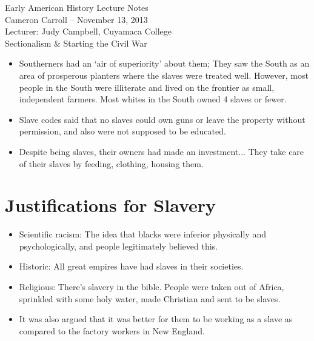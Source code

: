 \documentclass{article}
\begin{document}
\begin{center}
  {\small{} Early American History Lecture Notes} \\[0.6cm]
  {\small{} Cameron Carroll -- November 13, 2013} \\[0.6cm]
  {\small{} Lecturer: Judy Campbell, Cuyamaca College}\\[1cm]
  {\small{} Sectionalism \& Starting the Civil War}\\[1cm]
\end{center}

\tableofcontents
\newpage


\begin{itemize}
  \item Southerners had an `air of superiority' about them; They saw the South as an area of prosperous planters where the slaves were treated well. However, most people in the South were illiterate and lived on the frontier as small, independent farmers. Most whites in the South owned 4 slaves or fewer.
  \item Slave codes said that no slaves could own guns or leave the property without permission, and also were not supposed to be educated.
  \item Despite being slaves, their owners had made an investment... They take care of their slaves by feeding, clothing, housing them.
\end{itemize}

\section{Justifications for Slavery}
  \begin{itemize}
  \item Scientific racism: The idea that blacks were inferior physically and psychologically, and people legitimately believed this. 
  \item Historic: All great empires have had slaves in their societies.
  \item Religious: There's slavery in the bible. People were taken out of Africa, sprinkled with some holy water, made Christian and sent to be slaves. 
  \item It was also argued that it was better for them to be working as a slave as compared to the factory workers in New England. 
  \end{itemize}
\end{document}
